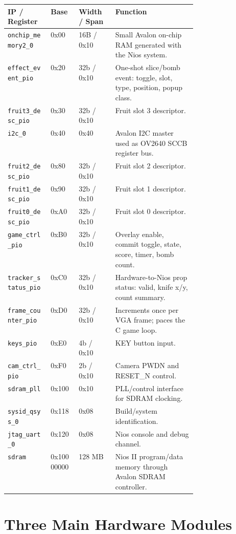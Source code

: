\documentclass[10pt]{article}
\begin{document}
\begin{center}
\small
\begin{tabular}{lll p{0.43\linewidth}}
\toprule
IP / Register & Base & Width / Span & Function \\
\midrule
\texttt{onchip\_memory2\_0} & 0x00 & 16B / 0x10 & Small Avalon on-chip RAM generated with the Nios system. \\
\texttt{effect\_event\_pio} & 0x20 & 32b / 0x10 & One-shot slice/bomb event: toggle, slot, type, position, popup class. \\
\texttt{fruit3\_desc\_pio} & 0x30 & 32b / 0x10 & Fruit slot 3 descriptor. \\
\texttt{i2c\_0} & 0x40 & 0x40 & Avalon I2C master used as OV2640 SCCB register bus. \\
\texttt{fruit2\_desc\_pio} & 0x80 & 32b / 0x10 & Fruit slot 2 descriptor. \\
\texttt{fruit1\_desc\_pio} & 0x90 & 32b / 0x10 & Fruit slot 1 descriptor. \\
\texttt{fruit0\_desc\_pio} & 0xA0 & 32b / 0x10 & Fruit slot 0 descriptor. \\
\texttt{game\_ctrl\_pio} & 0xB0 & 32b / 0x10 & Overlay enable, commit toggle, state, score, timer, bomb count. \\
\texttt{tracker\_status\_pio} & 0xC0 & 32b / 0x10 & Hardware-to-Nios prop status: valid, knife x/y, count summary. \\
\texttt{frame\_counter\_pio} & 0xD0 & 32b / 0x10 & Increments once per VGA frame; paces the C game loop. \\
\texttt{keys\_pio} & 0xE0 & 4b / 0x10 & KEY button input. \\
\texttt{cam\_ctrl\_pio} & 0xF0 & 2b / 0x10 & Camera PWDN and RESET\_N control. \\
\texttt{sdram\_pll} & 0x100 & 0x10 & PLL/control interface for SDRAM clocking. \\
\texttt{sysid\_qsys\_0} & 0x118 & 0x08 & Build/system identification. \\
\texttt{jtag\_uart\_0} & 0x120 & 0x08 & Nios console and debug channel. \\
\texttt{sdram} & 0x10000000 & 128 MB & Nios II program/data memory through Avalon SDRAM controller. \\
\bottomrule
\end{tabular}
\end{center}

\section{Three Main Hardware Modules}
\end{document}
